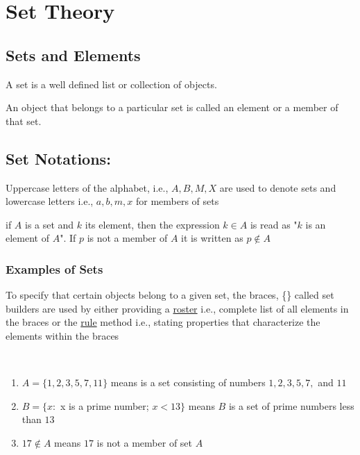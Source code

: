 \chapter{Set Theory}%

\section{Sets and Elements}
\begin{definition}
    A set is a well defined list or collection of objects.
\end{definition}

\begin{definition}
    An object that belongs to a particular set is called an element or a member of that set.
\end{definition}

\section{Set Notations:}

\begin{para}
    Uppercase letters of the alphabet, i.e., $A, B, M, X$ are used to denote sets and lowercase letters i.e., $a, b, m, x$ for members of sets
\end{para}

\begin{para}
    if $A$ is a set and $k$ its element, then the expression $k \in A$ is read as "$k$ is an element of $A$". If $p$ is not a member of $A$ it is written as $p \notin A$
\end{para}

\subsection{Examples of Sets}

\begin{para}
    To specify that certain objects belong to a given set, the braces, \{\} called set builders are used by either providing a \underline{roster} i.e., complete list of all elements in the braces or the \underline{rule} method i.e., stating properties that characterize the elements within the braces
\end{para}

\begin{examples}
    \mbox{}\\[-\baselineskip] %
    \begin{enumerate}
        \item $A = \{1,2,3,5,7,11\}$ means is a set consisting of numbers $1,2,3,5,7,$ and $11$
        \item $B = \{x:$ x is a prime number; $x < 13\}$ means $B$ is a set of prime numbers less than $13$
        \item $17 \notin A$ means $17$ is not a member of set $A$
    \end{enumerate}
\end{examples}

